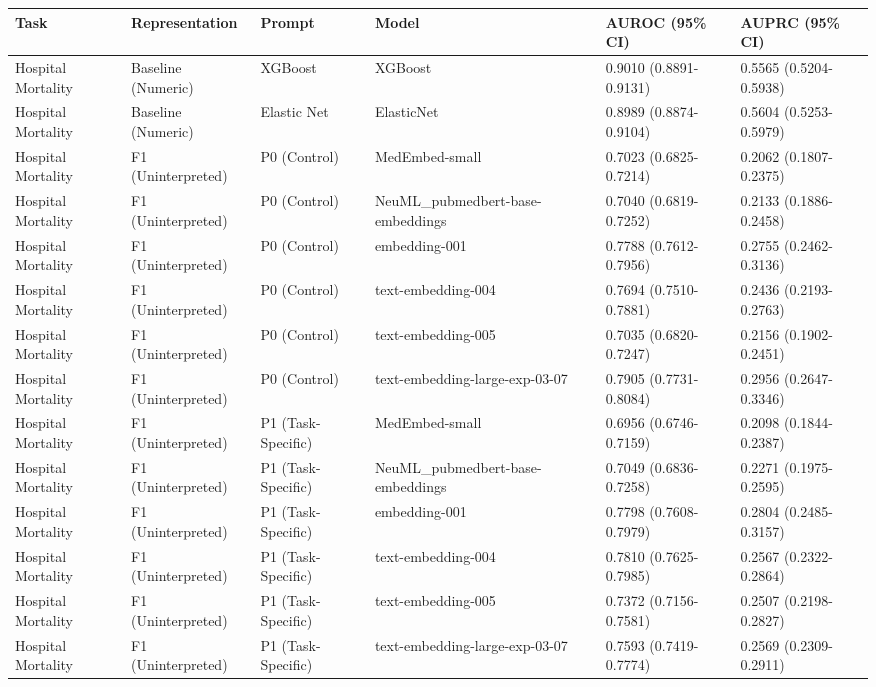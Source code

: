 \documentclass[border=0pt]{standalone}
\begin{document}
\begin{adjustbox}{width=\textwidth}
\begin{tabular}{llllll}
\toprule
Task & Representation & Prompt & Model & AUROC (95\% CI) & AUPRC (95\% CI) \\
\midrule
Hospital Mortality & Baseline (Numeric) & XGBoost & XGBoost & 0.9010 (0.8891-0.9131) & 0.5565 (0.5204-0.5938) \\
Hospital Mortality & Baseline (Numeric) & Elastic Net & ElasticNet & 0.8989 (0.8874-0.9104) & 0.5604 (0.5253-0.5979) \\
Hospital Mortality & F1 (Uninterpreted) & P0 (Control) & MedEmbed-small & 0.7023 (0.6825-0.7214) & 0.2062 (0.1807-0.2375) \\
Hospital Mortality & F1 (Uninterpreted) & P0 (Control) & NeuML\_pubmedbert-base-embeddings & 0.7040 (0.6819-0.7252) & 0.2133 (0.1886-0.2458) \\
Hospital Mortality & F1 (Uninterpreted) & P0 (Control) & embedding-001 & 0.7788 (0.7612-0.7956) & 0.2755 (0.2462-0.3136) \\
Hospital Mortality & F1 (Uninterpreted) & P0 (Control) & text-embedding-004 & 0.7694 (0.7510-0.7881) & 0.2436 (0.2193-0.2763) \\
Hospital Mortality & F1 (Uninterpreted) & P0 (Control) & text-embedding-005 & 0.7035 (0.6820-0.7247) & 0.2156 (0.1902-0.2451) \\
Hospital Mortality & F1 (Uninterpreted) & P0 (Control) & text-embedding-large-exp-03-07 & 0.7905 (0.7731-0.8084) & 0.2956 (0.2647-0.3346) \\
Hospital Mortality & F1 (Uninterpreted) & P1 (Task-Specific) & MedEmbed-small & 0.6956 (0.6746-0.7159) & 0.2098 (0.1844-0.2387) \\
Hospital Mortality & F1 (Uninterpreted) & P1 (Task-Specific) & NeuML\_pubmedbert-base-embeddings & 0.7049 (0.6836-0.7258) & 0.2271 (0.1975-0.2595) \\
Hospital Mortality & F1 (Uninterpreted) & P1 (Task-Specific) & embedding-001 & 0.7798 (0.7608-0.7979) & 0.2804 (0.2485-0.3157) \\
Hospital Mortality & F1 (Uninterpreted) & P1 (Task-Specific) & text-embedding-004 & 0.7810 (0.7625-0.7985) & 0.2567 (0.2322-0.2864) \\
Hospital Mortality & F1 (Uninterpreted) & P1 (Task-Specific) & text-embedding-005 & 0.7372 (0.7156-0.7581) & 0.2507 (0.2198-0.2827) \\
Hospital Mortality & F1 (Uninterpreted) & P1 (Task-Specific) & text-embedding-large-exp-03-07 & 0.7593 (0.7419-0.7774) & 0.2569 (0.2309-0.2911) \\

\end{tabular}
\end{adjustbox}
\end{document}
